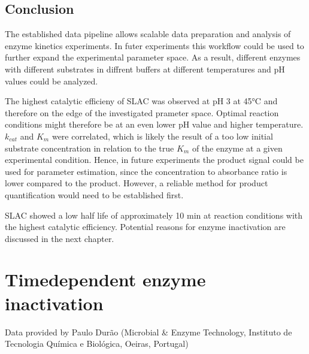 \documentclass[letterpaper,10pt,english]{jupyterBook}
\begin{document}
\subsection{Conclusion}
\label{\detokenize{scenarios/SLAC_kinetic_characterization:conclusion}}
\sphinxAtStartPar
{}The established data pipeline allows scalable data preparation and analysis of enzyme kinetics experiments. In futer experiments this workflow could be used to further expand the experimental parameter space. As a result, different enzymes with different substrates in diffrent buffers at different temperatures and pH values could be analyzed.

\sphinxAtStartPar
{}The highest catalytic efficieny of SLAC was observed at pH 3 at 45°C and therefore on the edge of the investigated prameter space. Optimal reaction conditions might therefore be at an even lower pH value and higher temperature. \(k_{cat}\) and \(K_{m}\) were correlated, which is likely the result of a too low initial substrate concentration in relation to the true \(K_{m}\) of the enzyme at a given experimental condition. Hence, in future experiments the product signal could be used for parameter estimation, since the concentration to absorbance ratio is lower compared to the product. However, a reliable method for product quantification would need to be established first.

\sphinxAtStartPar
{}SLAC showed a low half life of approximately 10 min at reaction conditions with the highest catalytic efficiency. Potential reasons for enzyme inactivation are discussed in the next chapter.

\sphinxstepscope


\section{Time\sphinxhyphen{}dependent enzyme inactivation}
\label{\detokenize{scenarios/enzyme_inactivation:scenario-d-br-time-dependent-enzyme-inactivation}}\label{\detokenize{scenarios/enzyme_inactivation::doc}}
\sphinxAtStartPar
Data provided by Paulo Durão (Microbial \& Enzyme Technology, Instituto de Tecnologia Química e Biológica, Oeiras, Portugal)
\end{document}
